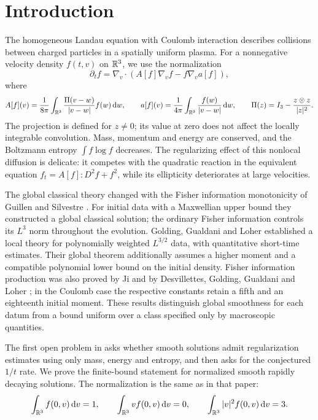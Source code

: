 \section{Introduction}

The homogeneous Landau equation with Coulomb interaction describes collisions between charged particles in a spatially uniform plasma. For a nonnegative velocity density $f(t,v)$ on $\mathbb R^3$, we use the normalization
\begin{equation}\label{eq:landau}
 \partial_tf=\nabla_v\cdot(A[f]\nabla_vf-f\nabla_va[f]),
\end{equation}
where
\begin{equation}\label{eq:coefficients}
 A[f](v)=\frac1{8\pi}\int_{\mathbb R^3}\frac{\Pi(v-w)}{|v-w|}f(w)\,\mathrm dw,
 \qquad a[f](v)=\frac1{4\pi}\int_{\mathbb R^3}\frac{f(w)}{|v-w|}\,\mathrm dw,
 \qquad\Pi(z)=I_3-\frac{z\otimes z}{|z|^2}.
\end{equation}
The projection is defined for $z\ne0$; its value at zero does not affect the locally integrable convolution. Mass, momentum and energy are conserved, and the Boltzmann entropy $\int f\log f$ decreases. The regularizing effect of this nonlocal diffusion is delicate: it competes with the quadratic reaction in the equivalent equation $f_t=A[f]:D^2f+f^2$, while its ellipticity deteriorates at large velocities.

The global classical theory changed with the Fisher information monotonicity of Guillen and Silvestre \cite{GS}. For initial data with a Maxwellian upper bound they constructed a global classical solution; the ordinary Fisher information controls its $L^3$ norm throughout the evolution. Golding, Gualdani and Loher \cite[Theorem~1.1]{GGL} established a local theory for polynomially weighted $L^{3/2}$ data, with quantitative short-time estimates. Their global theorem \cite[Theorem~1.3 and (1.5)]{GGL} additionally assumes a higher moment and a compatible polynomial lower bound on the initial density. Fisher information production was also proved by Ji \cite[Theorem~1.4]{Ji} and by Desvillettes, Golding, Gualdani and Loher \cite[Theorem~1]{DGGL}; in the Coulomb case the respective constants retain a fifth and an eighteenth initial moment. These results distinguish global smoothness for each datum from a bound uniform over a class specified only by macroscopic quantities.

The first open problem in \cite[Section~1]{GGL} asks whether smooth solutions admit regularization estimates using only mass, energy and entropy, and then asks for the conjectured $1/t$ rate. We prove the finite-bound statement for normalized smooth rapidly decaying solutions. The normalization is the same as in that paper:
\begin{equation}\label{eq:normalization}
 \int_{\mathbb R^3}f(0,v)\,\mathrm dv=1,\qquad
 \int_{\mathbb R^3}vf(0,v)\,\mathrm dv=0,\qquad
 \int_{\mathbb R^3}|v|^2f(0,v)\,\mathrm dv=3.
\end{equation}

